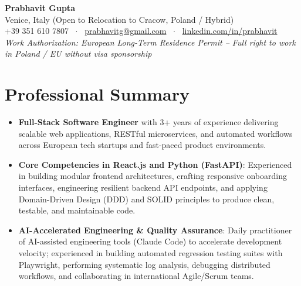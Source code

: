 \documentclass[10pt,a4paper]{article}
\begin{document}
\begin{center}
    {\Huge \textbf{\color{primary} Prabhavit Gupta}} \\ \vspace{4pt}
    Venice, Italy (Open to Relocation to Cracow, Poland / Hybrid) \\ \vspace{2pt}
    +39 351 610 7807 \ $\cdot$ \ \href{mailto:prabhavitg@gmail.com}{prabhavitg@gmail.com} \ $\cdot$ \ \href{https://www.linkedin.com/in/prabhavit/}{linkedin.com/in/prabhavit} \\ \vspace{2pt}
    \small{\textit{Work Authorization: European Long-Term Residence Permit -- Full right to work in Poland / EU without visa sponsorship}}
\end{center}

\vspace{-6pt}

\section{Professional Summary}
\begin{itemize}
    \item \textbf{Full-Stack Software Engineer} with 3+ years of experience delivering scalable web applications, RESTful microservices, and automated workflows across European tech startups and fast-paced product environments.
    \item \textbf{Core Competencies in React.js and Python (FastAPI)}: Experienced in building modular frontend architectures, crafting responsive onboarding interfaces, engineering resilient backend API endpoints, and applying Domain-Driven Design (DDD) and SOLID principles to produce clean, testable, and maintainable code.
    \item \textbf{AI-Accelerated Engineering \& Quality Assurance}: Daily practitioner of AI-assisted engineering tools (Claude Code) to accelerate development velocity; experienced in building automated regression testing suites with Playwright, performing systematic log analysis, debugging distributed workflows, and collaborating in international Agile/Scrum teams.
\end{itemize}
\end{document}
